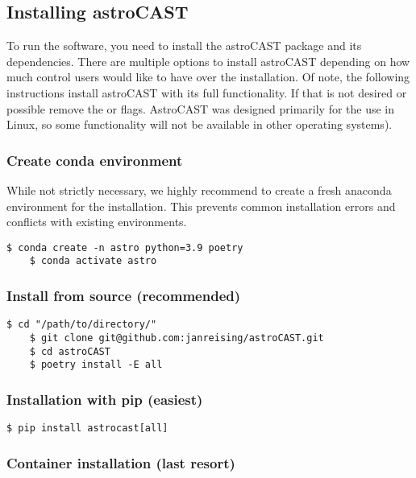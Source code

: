 \subsection{Installing \ac{astroCAST}}
To run the software, you need to install the astroCAST package and its dependencies. There are multiple options to install \ac{astroCAST} depending on how much control users would like to have over the installation. Of note, the following instructions install astroCAST with its full functionality. If that is not desired or possible remove the  or \inlineBash{[all]} flags. AstroCAST was designed primarily for the use in Linux, so some functionality will not be available in other operating systems).

\subsubsection{Create conda environment}
While not strictly necessary, we highly recommend to create a fresh anaconda environment for the installation. This
prevents common installation errors and conflicts with existing environments.

\begin{lstlisting}[style=bashStyle]
    $ conda create -n astro python=3.9 poetry
    $ conda activate astro
\end{lstlisting}

\subsubsection{Install from source (recommended)}
\label{res:install-from-source}
\begin{lstlisting}[style=bashStyle]
    $ cd "/path/to/directory/"
    $ git clone git@github.com:janreising/astroCAST.git
    $ cd astroCAST
    $ poetry install -E all
\end{lstlisting}

\subsubsection{Installation with pip (easiest)}
\begin{lstlisting}[style=bashStyle]
    $ pip install astrocast[all]
\end{lstlisting}

\subsubsection{Container installation (last resort)}

